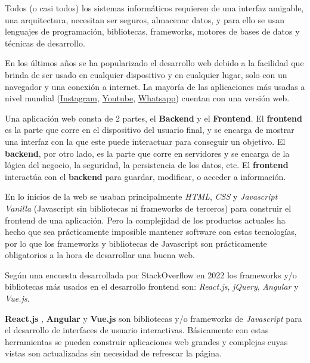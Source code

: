 Todos (o casi todos) los sistemas informáticos requieren de una interfaz amigable, una arquitectura, necesitan ser seguros, almacenar datos, y para ello se usan lenguajes de programación, bibliotecas, frameworks, motores de bases de datos y técnicas de desarrollo.
\newline

En los últimos años se ha popularizado el desarrollo web debido a la facilidad que brinda de ser usado en cualquier dispositivo y en cualquier lugar, solo con un navegador y una conexión a internet. La mayoría de las aplicaciones más usadas a nivel mundial (\href{instagram.com}{Instagram}, \href{youtube.com}{Youtube}, \href{https://web.whatsapp.com/}{Whatsapp}) cuentan con una versión web.
\newline

Una aplicación web consta de 2 partes, el \textbf{Backend} y el \textbf{Frontend}. El \textbf{frontend} es la parte que corre en el dispositivo del usuario final, y se encarga de mostrar una interfaz con la que este puede interactuar para conseguir un objetivo. El \textbf{backend}, por otro lado, es la parte que corre en servidores y se encarga de la lógica del negocio, la seguridad, la persistencia de los datos, etc. El \textbf{frontend} interactúa con el \textbf{backend} para guardar, modificar, o acceder a información.
\newline

En lo inicios de la web se usaban principalmente \textit{HTML}, \textit{CSS} y \textit{Javascript Vanilla} (Javascript sin bibliotecas ni frameworks de terceros) para construir el frontend de una aplicación. Pero la complejidad de los productos actuales ha hecho que sea prácticamente imposible mantener software con estas tecnologías, por lo que los frameworks y bibliotecas de Javascript son prácticamente obligatorios a la hora de desarrollar una buena web.
\newline

Según una encuesta desarrollada por StackOverflow \cite{encuesta2022} en 2022 los frameworks y/o bibliotecas más usados en el desarrollo frontend son: \textit{React.js}, \textit{jQuery}, \textit{Angular} y \textit{Vue.js}.
\newline

\textbf{React.js} \cite{react}, \textbf{Angular} \cite{angular} y \textbf{Vue.js} \cite{vue} son bibliotecas y/o frameworks de \textit{Javascript} para el desarrollo de interfaces de usuario interactivas. Básicamente con estas herramientas se pueden construir aplicaciones web grandes y complejas cuyas vistas son actualizadas sin necesidad de refrescar la página.
\newline

